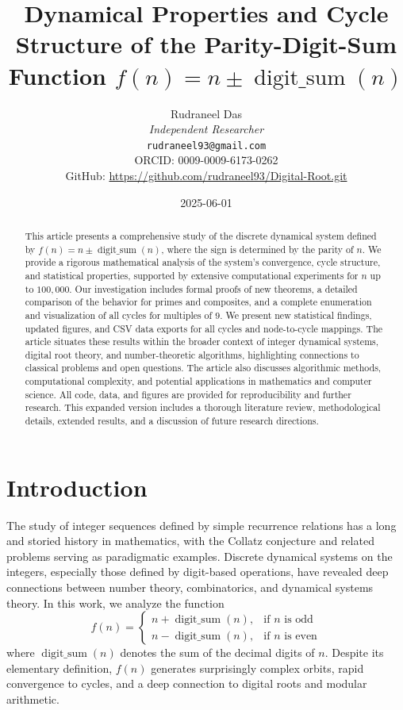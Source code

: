 \documentclass[12pt]{article}
\title{Dynamical Properties and Cycle Structure of the Parity-Digit-Sum Function $f(n) = n \pm \operatorname{digit\_sum}(n)$}
\author{Rudraneel Das \\ 
\textit{Independent Researcher} \\ 
\texttt{rudraneel93@gmail.com} \\ 
ORCID: 0009-0009-6173-0262 \\ 
GitHub: \url{https://github.com/rudraneel93/Digital-Root.git}
}
\date{2025-06-01}
\begin{document}
\maketitle


\begin{abstract}
This article presents a comprehensive study of the discrete dynamical system defined by $f(n) = n \pm \operatorname{digit\_sum}(n)$, where the sign is determined by the parity of $n$. We provide a rigorous mathematical analysis of the system's convergence, cycle structure, and statistical properties, supported by extensive computational experiments for $n$ up to $100,000$. Our investigation includes formal proofs of new theorems, a detailed comparison of the behavior for primes and composites, and a complete enumeration and visualization of all cycles for multiples of $9$. We present new statistical findings, updated figures, and CSV data exports for all cycles and node-to-cycle mappings. The article situates these results within the broader context of integer dynamical systems, digital root theory, and number-theoretic algorithms, highlighting connections to classical problems and open questions. The article also discusses algorithmic methods, computational complexity, and potential applications in mathematics and computer science. All code, data, and figures are provided for reproducibility and further research. This expanded version includes a thorough literature review, methodological details, extended results, and a discussion of future research directions.
\end{abstract}

\tableofcontents


\section{Introduction}
The study of integer sequences defined by simple recurrence relations has a long and storied history in mathematics, with the Collatz conjecture and related problems serving as paradigmatic examples. Discrete dynamical systems on the integers, especially those defined by digit-based operations, have revealed deep connections between number theory, combinatorics, and dynamical systems theory. In this work, we analyze the function
\begin{equation}
    f(n) = \begin{cases}
        n + \operatorname{digit\_sum}(n), & \text{if } n \text{ is odd} \\
        n - \operatorname{digit\_sum}(n), & \text{if } n \text{ is even}
    \end{cases}
\end{equation}
where $\operatorname{digit\_sum}(n)$ denotes the sum of the decimal digits of $n$. Despite its elementary definition, $f(n)$ generates surprisingly complex orbits, rapid convergence to cycles, and a deep connection to digital roots and modular arithmetic. 
\end{document}

